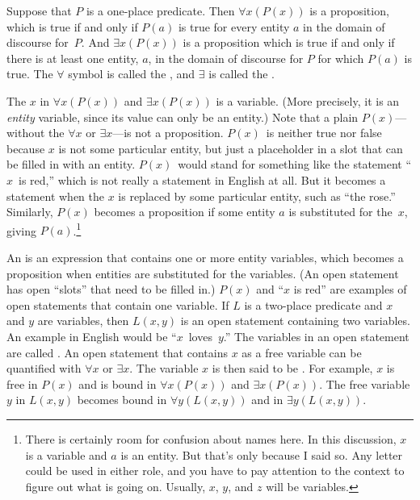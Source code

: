 \begin{definition}
Suppose that $P$ is a one-place predicate.  Then $\forall x(P(x))$ is
a proposition, which is true if and only if $P(a)$ is true for every
entity $a$ in the domain of discourse for~$P$.  And $\exists x(P(x))$
is a proposition which is true if and only if there is at least one
entity, $a$, in the domain of discourse for $P$ for which $P(a)$ is
true.  The $\forall$ symbol is called the ,
and $\exists$ is called the .
\end{definition}

The $x$ in $\forall x(P(x))$ and $\exists x(P(x))$ is a variable.
(More precisely, it is an \emph{entity} variable, since its value
can only be an entity.)
Note that a plain $P(x)$---without the $\forall x$ or $\exists x$---is
not a proposition.  $P(x)$~is neither true nor false because $x$
is not some particular entity, but just a placeholder in a slot that
can be filled in with an entity.  $P(x)$~would stand for
something like the statement ``$x$~is red,'' which is not really a
statement in English at all.  But it becomes a statement when
the $x$ is replaced by some particular entity, such as ``the rose.''
Similarly, $P(x)$ becomes a proposition if some entity $a$ is substituted
for the~$x$, giving $P(a)$.\footnote{There is certainly room for confusion
about names here.  In this discussion, $x$ is a variable and $a$ is 
an entity.  But that's only because I said so.  Any letter could be used
in either role, and you have to pay attention to the context to
figure out what is going on.  Usually, $x$, $y$, and $z$ will be variables.}

An  is an expression that contains one or more entity
variables, which becomes a proposition when entities are substituted
for the variables.  (An open statement has open ``slots'' that need to
be filled in.)  $P(x)$ and ``$x$ is red'' are examples of open 
statements that contain one variable.  If $L$ is a two-place predicate
and $x$ and $y$ are variables, then $L(x,y)$ is an open statement
containing two variables.  An example in English would be
``$x$~loves~$y$.''  The variables in an open statement are called 
.  An open statement that contains $x$ as a free
variable can be quantified with $\forall x$ or $\exists x$.
The variable $x$ is then said to be .  For example,
$x$ is free in $P(x)$ and is bound in $\forall x(P(x))$ and
$\exists x(P(x))$.  The free variable $y$ in $L(x,y)$ becomes
bound in $\forall y(L(x,y))$ and in $\exists y(L(x,y))$.


